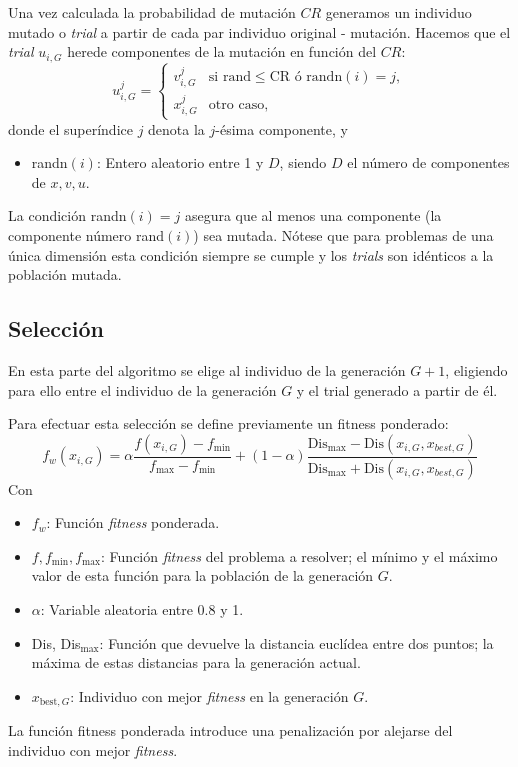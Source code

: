 \documentclass{article}
\begin{document}
Una vez calculada la probabilidad de mutación $CR$ generamos un individuo mutado o \textit{trial} a partir de cada par individuo original - mutación. Hacemos que el \textit{trial} $u_{i,G}$ herede componentes de la mutación en función del $CR$:
\begin{equation}
    u_{i,G}^j = \left\{\begin{array}{ll}
        v_{i,G}^j&\text{si rand}\le\text{CR ó randn}(i)=j,\\
        x_{i,G}^j&\text{otro caso},
        \end{array}\right.
    \label{ec_crossover}
\end{equation}
donde el superíndice $j$ denota la $j$-ésima componente, y
\begin{itemize}
    \item randn$(i)$: Entero aleatorio entre 1 y $D$, siendo $D$ el número de componentes de $x, v, u$.
\end{itemize}
La condición randn$(i)=j$ asegura que al menos una componente (la componente número rand$(i)$) sea mutada. Nótese que para problemas de una única dimensión esta condición siempre se cumple y los \textit{trials} son idénticos a la población mutada.
\subsection{Selección}
En esta parte del algoritmo se elige al individuo de la generación $G+1$, eligiendo para ello entre el individuo de la generación $G$ y el trial generado a partir de él.

Para efectuar esta selección se define previamente un fitness ponderado:
\begin{equation}
    f_w(x_{i,G}) = \alpha\frac{f(x_{i,G}) - f_\text{min}}{f_\text{max} - f_\text{min}} + (1-\alpha)\frac{\text{Dis}_\text{max} - \text{Dis}(x_{i,G}, x_{best,G})}{\text{Dis}_\text{max} + \text{Dis}(x_{i,G}, x_{best,G})}
    \label{ec_fitness_ponderado}
\end{equation}
Con
\begin{itemize}
    \item $f_w$: Función \textit{fitness} ponderada.
    \item $f, f_\text{min}, f_\text{max}$: Función \textit{fitness} del problema a resolver; el mínimo y el máximo valor de esta función para la población de la generación $G$.
    \item $\alpha$: Variable aleatoria entre 0.8 y 1.
    \item Dis, Dis$_\text{max}$: Función que devuelve la distancia euclídea entre dos puntos; la máxima de estas distancias para la generación actual.
    \item $x_{\text{best}, G}$: Individuo con mejor \textit{fitness} en la generación $G$.
\end{itemize}
La función fitness ponderada introduce una penalización por alejarse del individuo con mejor \textit{fitness}.
\end{document}
